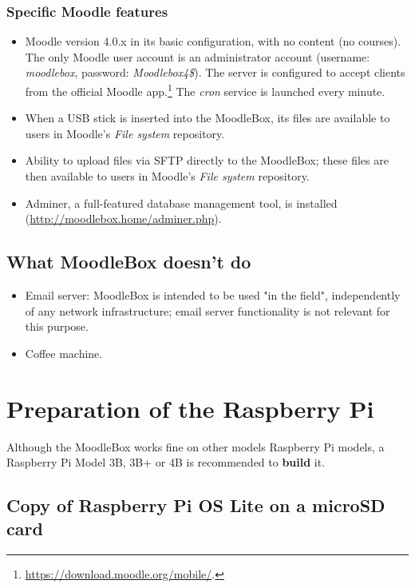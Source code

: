 \documentclass[12pt]{article}
\begin{document}
\subsubsection{Specific Moodle features}
\begin{itemize}
\item Moodle version 4.0.x in its basic configuration, with no content (no courses).
The only Moodle user account is an administrator account (username: \emph{moodlebox}, password: \emph{Moodlebox4\$}).
The server is configured to accept clients from the official Moodle app.\footnote{\url{https://download.moodle.org/mobile/}.} The \textsl{cron} service is launched every minute.
\item When a USB stick is inserted into the MoodleBox, its files are available to users in Moodle's \textsl{File system} repository.
\item Ability to upload files via SFTP directly to the MoodleBox; these files are then available to users in Moodle's \textsl{File system} repository.
\item Adminer, a full-featured database management tool, is installed (\url{http://moodlebox.home/adminer.php}).
\end{itemize}

\subsection{What MoodleBox doesn't do}

\begin{itemize}
\item Email server: MoodleBox is intended to be used "in the field", independently of any network infrastructure; email server functionality is not relevant for this purpose.
\item Coffee machine.
\end{itemize}

\section{Preparation of the Raspberry Pi}

Although the MoodleBox works fine on other models Raspberry Pi models, a Raspberry Pi Model 3B, 3B+ or 4B is recommended to \textbf{build} it.

\subsection{Copy of Raspberry Pi OS Lite on a microSD card}
\end{document}
